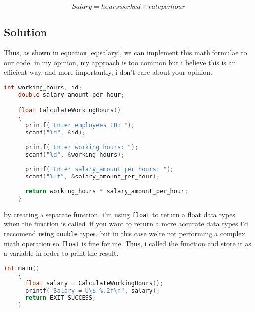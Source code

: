 \documentclass{article}
\begin{document}
  \begin{equation}
  Salary = hoursworked \times rateperhour
  \label{eq:salary}
  \end{equation}

  \subsection{Solution}

  Thus, as shown in equation \ref{eq:salary}, we can implement this math formulae to our code. in my opinion, my approach is too common but i believe this is an efficient way. and more importantly, i don't care about your opinion.
  \begin{lstlisting}[language=C, caption=Code Implementation]
    int working_hours, id;
    double salary_amount_per_hour;

    float CalculateWorkingHours()
    {
      printf("Enter employees ID: ");
      scanf("%d", &id);
      
      printf("Enter working hours: ");
      scanf("%d", &working_hours);
    
      printf("Enter salary_amount per hours: ");
      scanf("%lf", &salary_amount_per_hour);
    
      return working_hours * salary_amount_per_hour;
    }
  \end{lstlisting}
  by creating a separate function, i'm using \texttt{float} to return a float data types when the function is called. if you want to return a more accurate data types
  i'd reccomend using \texttt{double} types. but in this case we're not performing a complex math operation so \texttt{float} is fine for me.
  Thus, i called the function and store it as a variable in order to print the result. 
  \begin{lstlisting}[language=C, caption=Call the function]
    int main()
    {
      float salary = CalculateWorkingHours();
      printf("Salary = U\$ %.2f\n", salary);
      return EXIT_SUCCESS;
    }
  \end{lstlisting}
\end{document}
